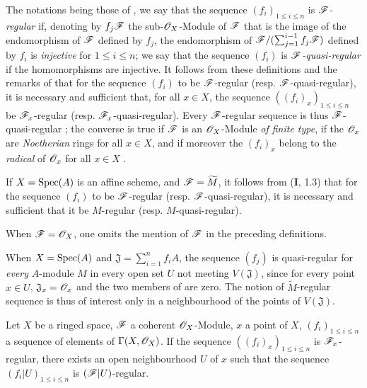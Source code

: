 \begin{env}[15.2.2]
\label{0.15.2.2}
The notations being those of , we say that the sequence $(f_i)_{1\leq i\leq n}$ is \emph{$\mathscr{F}$-regular} if, denoting by $f_j\mathscr{F}$ the sub-$\mathscr{O}_X$-Module of $\mathscr{F}$ that is the image of the endomorphism of $\mathscr{F}$ defined by $f_j$, the endomorphism of $\mathscr{F}/(\sum_{j=1}^{i-1}f_j\mathscr{F})$ defined by $f_i$ is \emph{injective} for $1\leq i\leq n$;
we say that the sequence $(f_i)$ is \emph{$\mathscr{F}$-quasi-regular} if the homomorphisms  are injective.
It follows from these definitions and the remarks of  that for the sequence $(f_i)$ to be $\mathscr{F}$-regular (resp. $\mathscr{F}$-quasi-regular), it is necessary and sufficient that, for all $x\in X$, the sequence $((f_i)_x)_{1\leq i\leq n}$ be $\mathscr{F}_x$-regular (resp. $\mathscr{F}_x$-quasi-regular).
Every $\mathscr{F}$-regular sequence is thus $\mathscr{F}$-quasi-regular ;
the converse is true if $\mathscr{F}$ is an $\mathscr{O}_X$-Module \emph{of finite type}, if the $\mathscr{O}_x$ are \emph{Noetherian} rings for all $x\in X$, and if moreover the $(f_i)_x$ belong to the \emph{radical} of $\mathscr{O}_x$ for all $x\in X$ .

If $X=\operatorname{Spec}(A)$ is an affine scheme, and $\mathscr{F}=\widetilde{M}$, it follows from ($\mathbf{I}$, 1.3) that for the sequence $(f_i)$ to be $\mathscr{F}$-regular (resp. $\mathscr{F}$-quasi-regular), it is necessary and sufficient that it be $M$-regular (resp. $M$-quasi-regular).

When $\mathscr{F}=\mathscr{O}_X$, one omits the mention of $\mathscr{F}$ in the preceding definitions.
\end{env}

\begin{remark}[15.2.3]
\label{0.15.2.3}
When $X=\operatorname{Spec}(A)$ and $\mathfrak{J}=\sum_{i=1}^n f_iA$, the sequence $(f_j)$ is quasi-regular for \emph{every} $A$-module $M$ in every open set $U$ not meeting $V(\mathfrak{J})$, since for every point $x\in U$, $\mathfrak{J}_x=\mathscr{O}_x$ and the two members of  are zero.
The notion of $\widetilde{M}$-regular sequence is thus of interest only in a neighbourhood of the points of $V(\mathfrak{J})$.
\end{remark}

\begin{proposition}[15.2.4]
\label{0.15.2.4}
Let $X$ be a ringed space, $\mathscr{F}$ a coherent $\mathscr{O}_X$-Module, $x$ a point of $X$, $(f_i)_{1\leq i\leq n}$ a sequence of elements of $\Gamma(X,\mathscr{O}_X)$.
If the sequence $((f_i)_x)_{1\leq i\leq n}$ is $\mathscr{F}_x$-regular, there exists an open neighbourhood $U$ of $x$ such that the sequence $(f_i|U)_{1\leq i\leq n}$ is $(\mathscr{F}|U)$-regular.
\end{proposition}

